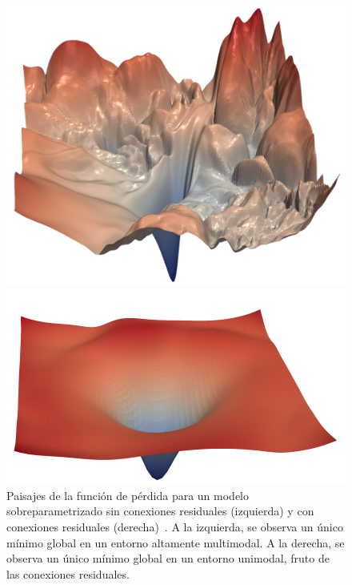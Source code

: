 \begin{figure}[h!]
    \centering
    \begin{minipage}{0.45\textwidth}
        \centering
        \includegraphics[width=\linewidth]{img/experiments/landscapemultimodal.png}
    \end{minipage}
    \hfill
    \begin{minipage}{0.45\textwidth}
        \centering
        \includegraphics[width=\linewidth]{img/experiments/landscapeunimodal.png}
    \end{minipage}
    \caption[Paisajes de la función de pérdida para distintos modelos sobreparametrizados~\cite{Li2018}.]{Paisajes de la función de pérdida para un modelo sobreparametrizado sin conexiones residuales (izquierda) y con conexiones residuales (derecha)~\cite{Li2018}. A la izquierda, se observa un único mínimo global en un entorno altamente multimodal. A la derecha, se observa un único mínimo global en un entorno unimodal, fruto de las conexiones residuales.}\label{fig:landscapes}
\end{figure} 

